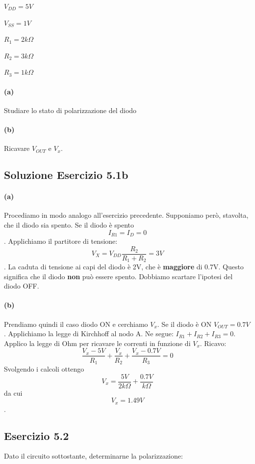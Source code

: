 \documentclass[\main/main.tex]{subfiles}
\begin{document}
\begin{center}
  $V_{DD}=5V$

  $V_{SS}=1V$

  $R_1=2k\Omega$

  $R_2=3k\Omega$

  $R_3=1k\Omega$

\end{center}

\paragraph{(a)} Studiare lo stato di polarizzazione del diodo \paragraph{(b)} Ricavare $V_{OUT}$ e $V_x$.

\subsection{Soluzione Esercizio 5.1b}
\paragraph{(a)}
Procediamo in modo analogo all'esercizio precedente.
Supponiamo però, stavolta, che il diodo sia spento.
Se il diodo è spento \[I_{R1}=I_D=0\].
Applichiamo il partitore di tensione:
\[V_{X} = V_{DD}\frac{R_2}{R_1+R_2} = 3V\].
La caduta di tensione ai capi del diodo è 2V, che è \textbf{maggiore} di 0.7V.
Questo significa che il diodo \textbf{non} può essere spento.
Dobbiamo scartare l'ipotesi del diodo OFF.

\paragraph{(b)}
Prendiamo quindi il caso diodo ON e cerchiamo $V_x$.
Se il diodo è ON $V_{OUT}=0.7V$.
Applichiamo la legge di Kirchhoff al nodo A. Ne segue: $I_{R1}+I_{R2}+I_{R3}=0$.
Applico la legge di Ohm per ricavare le correnti in funzione di $V_x$.
Ricavo:
\[\frac{V_x-5V}{R_1} + \frac{V_x}{R_2} + \frac{V_x-0.7V}{R_3} =0 \]
Svolgendo i calcoli ottengo \[V_x = \frac{5V}{2k\Omega} + \frac{0.7V}{k\Omega} \]
da cui \[V_x=1.49V\].

\subsection{Esercizio 5.2}
Dato il circuito sottostante, determinarne la polarizzazione:
\end{document}
